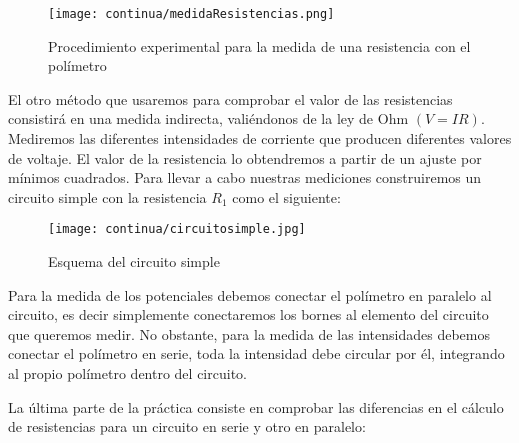 \documentclass[a4paper,12pt,titlepage]{article}
\begin{document}
\begin{figure}[h!]
    \centering
    \texttt{[image: continua/medidaResistencias.png]}
    \caption{Procedimiento experimental para la medida de una resistencia con el polímetro}
    \label{MedidaResistencias}
\end{figure}

\par El otro método que usaremos para comprobar el valor de las resistencias consistirá en una medida indirecta, valiéndonos de la ley de Ohm \newline $(V=IR)$. Mediremos las diferentes intensidades de corriente que producen diferentes valores de voltaje. El valor de la resistencia lo obtendremos a partir de un ajuste por mínimos cuadrados. Para llevar a cabo nuestras mediciones construiremos un circuito simple con la resistencia $R_{1}$ como el siguiente:

\begin{figure}[h!]
    \centering
    \texttt{[image: continua/circuitosimple.jpg]}
    \caption{Esquema del circuito simple}
    \label{Circuito simple}
\end{figure}

Para la medida de los potenciales debemos conectar el polímetro en paralelo al circuito, es decir simplemente conectaremos los bornes al elemento del circuito que queremos medir. No obstante, para la medida de las intensidades debemos conectar el polímetro en serie, toda la intensidad debe circular por él, integrando al propio polímetro dentro del circuito.\newline


\par La última parte de la práctica consiste en comprobar las diferencias en el cálculo de resistencias para un circuito en serie y otro en paralelo:
\end{document}
